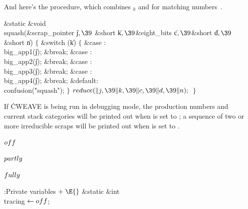 And here's the  procedure, which combines ${}_k$ and
 for matching numbers~.

\Y\B\1\1\&{static} \&{void} \\{squash}(\&{scrap\_pointer} \|j${},\39{}$%
\&{short} \|k${},\39{}$\&{eight\_bits} \|c${},\39{}$\&{short} \|d${},\39{}$%
\&{short} \|n)\2\2\6
${}\{{}$\1\6
\&{switch} (\|k)\5
${}\{{}$\1\6
\4\&{case} :\5
\\{big\_app1}(\|j);\6
\&{break};\6
\4\&{case} :\5
\\{big\_app2}(\|j);\6
\&{break};\6
\4\&{case} :\5
\\{big\_app3}(\|j);\6
\&{break};\6
\4\&{case} :\5
\\{big\_app4}(\|j);\6
\&{break};\6
\4\&{default}:\5
\\{confusion}(\.{"squash"});\6
\4${}\}{}$\2\6
${}\\{reduce}(\|j,\39\|k,\39\|c,\39\|d,\39\|n);{}$\6
\4${}\}{}$\2\par
\fi

If \.{CWEAVE} is being run in debugging mode, the production numbers and
current stack categories will be printed out when  is set to %
;
a sequence of two or more irreducible scraps will be printed out when
 is set to .

\Y\B\4\D$\\{off}$ \5
\par
\B\4\D$\\{partly}$ \5
\par
\B\4\D$\\{fully}$ \5
\par
\Y\B\4:Private variables\X${}\mathrel+\E{}$\6
\&{static} \&{int} \\{tracing}${}\leftarrow\\{off}{}$;\par
\fi

